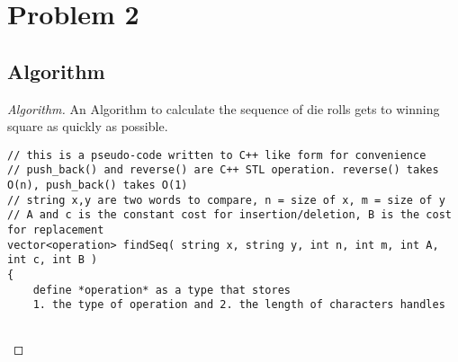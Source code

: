 \documentclass[openany]{article}
\begin{document}
\section*{Problem 2}

\subsection*{Algorithm}
\begin{proof}[Algorithm]{}
		\renewcommand{\qedsymbol}{}
		An Algorithm to calculate the sequence of die rolls gets to winning square as quickly as possible.
		\begin{lstlisting}[basicstyle=\fontsize{8}{9}\selectfont\ttfamily]
// this is a pseudo-code written to C++ like form for convenience
// push_back() and reverse() are C++ STL operation. reverse() takes O(n), push_back() takes O(1)
// string x,y are two words to compare, n = size of x, m = size of y
// A and c is the constant cost for insertion/deletion, B is the cost for replacement
vector<operation> findSeq( string x, string y, int n, int m, int A, int c, int B )
{
    define *operation* as a type that stores
    1. the type of operation and 2. the length of characters handles
    

\end{lstlisting}
\end{proof}
\end{document}
